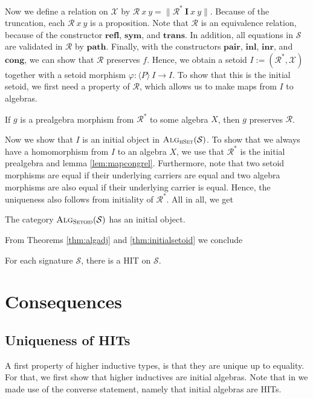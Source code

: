 \documentclass[9pt]{entcs}
\newcommand{\type}[1]{\textsc{#1}}
\newcommand{\constructor}[1]{\mathbf{#1}}
\newcommand{\category}[1]{\textsc{#1}}
\newcommand{\hset}{\type{hSet}} %
\newcommand{\0}{\textbf{0}} %
\newcommand{\trunct}[1]{\lVert #1 \rVert} %
\newcommand{\Def}{:=} %
\newcommand{\setoids}{\category{Setoid}} %
\newcommand{\I}{\constructor{I}} %
\newcommand{\sig}{\mathcal{S}} %
\newcommand{\Alg}[1]{\category{Alg}_{\hset}(#1)} %
\newcommand{\semPT}[1]{\langle #1 \rangle} %
\newcommand{\Algst}[1]{\category{Alg}_{\setoids}(#1)} %
\newcommand{\CRC}{\mathcal{X}} %
\newcommand{\CR}{\mathcal{R}^*} %
\newcommand{\CRR}{\mathcal{R}} %
\newcommand{\CRrefl}{\constructor{refl}} %
\newcommand{\CRsym}{\constructor{sym}} %
\newcommand{\CRtrans}{\constructor{trans}} %
\newcommand{\CRpair}{\constructor{pair}} %
\newcommand{\CRinl}{\constructor{inl}} %
\newcommand{\CRinr}{\constructor{inr}} %
\newcommand{\CRpath}{\constructor{path}} %
\newcommand{\CRcong}{\constructor{cong}} %
\begin{document}
Now we define a relation on $\CRC$ by $\CRR \> x \> y = \trunct{\CR \> \I \> x \> y}$.
Because of the truncation, each $\CRR \> x \> y$ is a proposition.
Note that $\CRR$ is an equivalence relation, because of the constructor $\CRrefl$, $\CRsym$, and $\CRtrans$.
In addition, all equations in $\sig$ are validated in $\CRR$ by $\CRpath$.
Finally, with the constructors $\CRpair$, $\CRinl$, $\CRinr$, and $\CRcong$, we can show that $\CRR$ preserves $f$.
Hence, we obtain a setoid $I \Def (\CR, \CRC)$ together with a setoid morphism $\varphi : \semPT{P} \> I \rightarrow I$.
To show that this is the initial setoid, we first need a property of $\CRR$, which allows us to make maps from $I$ to algebras.

\begin{lemma}
\label{lem:mapcongrel}
If $g$ is a prealgebra morphism from $\CR$ to some algebra $X$, then $g$ preserves $\CRR$.
\end{lemma}

Now we show that $I$ is an initial object in $\Alg{\sig}$.
To show that we always have a homomorphism from $I$ to an algebra $X$, we use that $\CR$ is the initial prealgebra and lemma \ref{lem:mapcongrel}.
Furthermore, note that two setoid morphisms are equal if their underlying carriers are equal and two algebra morphisms are also equal if their underlying carrier is equal.
Hence, the uniqueness also follows from initiality of $\CR$.
All in all, we get

\begin{theorem}
\label{thm:initialsetoid}
The category $\Algst{\sig}$ has an initial object.
\end{theorem}

From Theorems \ref{thm:algadj} and \ref{thm:initialsetoid} we conclude

\begin{corollary}
\label{thm:hit-exist}
For each signature $\sig$, there is a HIT on $\sig$.
\end{corollary}

\section{Consequences}
\label{sec:consequences}
\subsection{Uniqueness of HITs}
A first property of higher inductive types, is that they are unique up to equality.
For that, we first show that higher inductives are initial algebras.
Note that in  we made use of the converse statement, namely that initial algebras are HITs.
\end{document}
